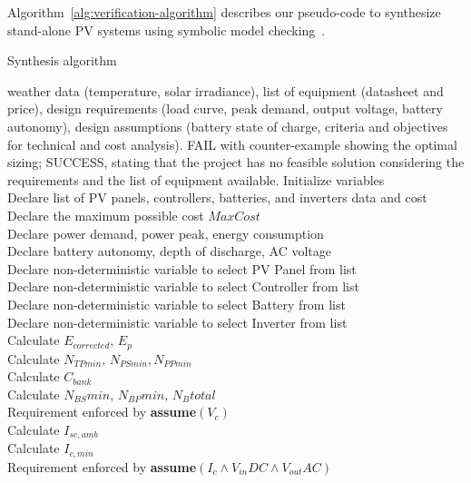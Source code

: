 \documentclass[runningheads]{llncs}
\begin{document}
Algorithm~\ref{alg:verification-algorithm} describes our pseudo-code to synthesize stand-alone PV systems using symbolic model checking~\cite{DBLP:journals/corr/abs-1909-13139}.
%
 \begin{algorithm}
 \caption{Synthesis algorithm}
 \begin{algorithmic}[1]
 \begin{scriptsize}
 \renewcommand{\algorithmicrequire}{\textbf{Input:}}
 \renewcommand{\algorithmicensure}{\textbf{Output:}}
 \REQUIRE weather data (temperature, solar irradiance), list of equipment (datasheet and price), design requirements (load curve, peak demand, output voltage, battery autonomy), design assumptions (battery state of charge, criteria and objectives for technical and cost analysis).
 \ENSURE FAIL with counter-example showing the optimal sizing; SUCCESS, stating that the project has no feasible solution considering the requirements and the list of equipment available.
 \STATE Initialize variables \\
 \STATE Declare list of PV panels, controllers, batteries, and inverters data and cost \\
 \STATE Declare the maximum possible cost $MaxCost$ \\
 \STATE Declare power demand, power peak, energy consumption \\
 \STATE Declare battery autonomy, depth of discharge, AC voltage \\
 	\STATE Declare non-deterministic variable to select PV Panel from list \\
 	\STATE Declare non-deterministic variable to select Controller from list \\
 	\STATE Declare non-deterministic variable to select Battery from list \\
 	\STATE Declare non-deterministic variable to select Inverter from list \\ 	
 	\STATE Calculate $E_{corrected}, \, E_{p} $ \\
	\STATE Calculate $N_{TPmin}, \, N_{PSmin}, N_{PPmin} $ \\
 	\STATE Calculate $C_{bank}$ \\
	\STATE Calculate $N_{BS}min, \, N_{BP}min, \, N_{B}total$ \\
	\STATE Requirement enforced by \textbf{assume}$(V_{c})$ \\
 	\STATE Calculate $I_{sc,amb}$ \\
 	\STATE Calculate $I_{c,min}$ \\
 	\STATE Requirement enforced by \textbf{assume}$(I_{c} \wedge V_{in}DC \wedge V_{out}AC)$ \\

\end{scriptsize}
\end{algorithmic}
\end{algorithm}
\end{document}
